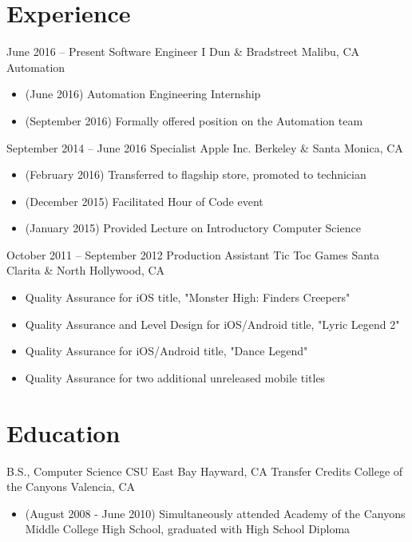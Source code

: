\documentclass[11pt,a4paper,sans]{moderncv}        %
\begin{document}
\makecvtitle

\section{Experience}		%

\cventry
{June 2016 -- Present}          {Software Engineer I}
{Dun \& Bradstreet}             {Malibu, CA}
{Automation}
{
    \begin{itemize}
    \item (June 2016) Automation Engineering Internship
    \item (September 2016) Formally offered position on the Automation team
    \end{itemize}
}

\cventry
{September 2014 -- June 2016}	{Specialist}
{Apple Inc.}	                {Berkeley \& Santa Monica, CA}
{}
{
  \begin{itemize}
  \item (February 2016) Transferred to flagship store, promoted to technician
  \item (December 2015) Facilitated Hour of Code event
  \item (January 2015) Provided Lecture on Introductory Computer Science
  \end{itemize}
}	%

\cventry
{October 2011 -- September 2012}	{Production Assistant}
{Tic Toc Games}	{Santa Clarita \& North Hollywood, CA}
{}
{
  \begin{itemize}
  \item Quality Assurance for iOS title, "Monster High: Finders Creepers"
  \item Quality Assurance and Level Design for iOS/Android title, "Lyric Legend 2"
  \item Quality Assurance for iOS/Android title, "Dance Legend"
  \item Quality Assurance for two additional unreleased mobile titles
  \end{itemize}
}	%

\section{Education}
  {B.S., Computer Science}
        {CSU East Bay}              {Hayward, CA}               {}{}  %
  {Transfer Credits}
        {College of the Canyons}    {Valencia, CA}              {}
{
  \begin{itemize}
  \item (August 2008 - June 2010) Simultaneously attended Academy of the Canyons Middle College High School, graduated with High School Diploma
  \end{itemize}
}
\end{document}
